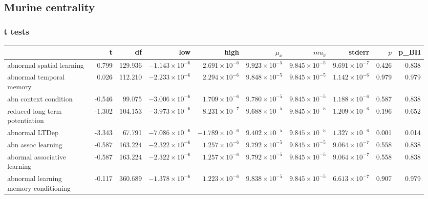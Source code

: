 \subsection{Murine centrality}
\subsubsection{t tests}



\begin{table}[ht]
\centering
\begin{adjustbox}{width=\textwidth}

\begin{tabular}{lrrrrrrrrr}
  \toprule
 & t & df & low & high & $\mu_x$ & $mu_y$ & stderr & $p$ & p\_BH \\ 
  \midrule
abnormal spatial learning & 0.799 & 129.936 & $-1.143 \times 10^{-6}$ & $2.691 \times 10^{-6}$ & $9.923 \times 10^{-5}$ & $9.845 \times 10^{-5}$ & $9.691 \times 10^{-7}$ & 0.426 & 0.838 \\ 
  abnormal temporal memory & 0.026 & 112.210 & $-2.233 \times 10^{-6}$ & $2.294 \times 10^{-6}$ & $9.848 \times 10^{-5}$ & $9.845 \times 10^{-5}$ & $1.142 \times 10^{-6}$ & 0.979 & 0.979 \\ 
  abn context condition & -0.546 & 99.075 & $-3.006 \times 10^{-6}$ & $1.709 \times 10^{-6}$ & $9.780 \times 10^{-5}$ & $9.845 \times 10^{-5}$ & $1.188 \times 10^{-6}$ & 0.587 & 0.838 \\ 
  reduced long term potentiation & -1.302 & 104.153 & $-3.973 \times 10^{-6}$ & $8.231 \times 10^{-7}$ & $9.688 \times 10^{-5}$ & $9.845 \times 10^{-5}$ & $1.209 \times 10^{-6}$ & 0.196 & 0.652 \\ 
  abnormal LTDep & -3.343 & 67.791 & $-7.086 \times 10^{-6}$ & $-1.789 \times 10^{-6}$ & $9.402 \times 10^{-5}$ & $9.845 \times 10^{-5}$ & $1.327 \times 10^{-6}$ & 0.001 & 0.014 \\ 
  abn assoc learning & -0.587 & 163.224 & $-2.322 \times 10^{-6}$ & $1.257 \times 10^{-6}$ & $9.792 \times 10^{-5}$ & $9.845 \times 10^{-5}$ & $9.064 \times 10^{-7}$ & 0.558 & 0.838 \\ 
  abormal associative learning & -0.587 & 163.224 & $-2.322 \times 10^{-6}$ & $1.257 \times 10^{-6}$ & $9.792 \times 10^{-5}$ & $9.845 \times 10^{-5}$ & $9.064 \times 10^{-7}$ & 0.558 & 0.838 \\ 
  abnormal learning memory conditioning & -0.117 & 360.689 & $-1.378 \times 10^{-6}$ & $1.223 \times 10^{-6}$ & $9.838 \times 10^{-5}$ & $9.845 \times 10^{-5}$ & $6.613 \times 10^{-7}$ & 0.907 & 0.979 \\ 

\end{tabular}
\end{adjustbox}
\end{table}
